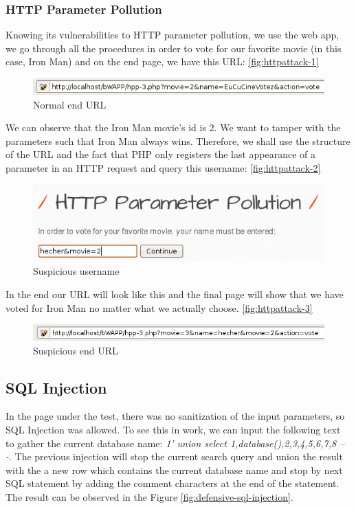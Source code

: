 \documentclass{article}
\begin{document}
\subsubsection{HTTP Parameter Pollution}
\label{section:http-parameter-pollution-exploit}
Knowing its vulnerabilities to HTTP parameter pollution, we use the web app, we go through all the procedures in order to vote for our favorite movie (in this case, Iron Man) and on the end page, we have this URL: \ref{fig:httpattack-1}
\begin{figure}
    \centering
    \includegraphics[width=1\linewidth]{Figures/httppp/http-attack1.png}
    \caption{\label{fig: httpattack-1}Normal end URL}
\end{figure}
We can observe that the Iron Man movie’s id is 2. We want to tamper with the parameters such that Iron Man always wins. Therefore, we shall use the structure of the URL and the fact that PHP only registers the last appearance of a parameter in an HTTP request and query this username: \ref{fig:httpattack-2}
\begin{figure}
    \centering
    \includegraphics[width=1\linewidth]{Figures/httppp/http-attack2.png}
    \caption{\label{fig: httpattack-2}Suspicious username}
\end{figure}
In the end our URL will look like this and the final page will show that we have voted for Iron Man no matter what we actually choose. \ref{fig:httpattack-3}
\begin{figure}
    \centering
    \includegraphics[width=1\linewidth]{Figures/httppp/http-attack3.png}
    \caption{\label{fig: httpattack-3}Suspicious end URL}
\end{figure}

\subsection{SQL Injection}
In the page under the test, there was no sanitization of the input parameters, so SQL Injection was allowed. To see this in work, we can input the following text to gather the current database name: \textit{1' union select 1,database(),2,3,4,5,6,7,8 -- -}. The previous injection will stop the current search query and union the result with the a new row which contains the current database name and stop by next SQL statement by adding the comment characters at the end of the statement. The result can be observed in the Figure \ref{fig:defensive-sql-injection}.
\end{document}
